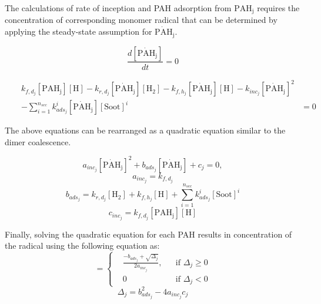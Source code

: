 The calculations of rate of inception and PAH adsorption from $\mathrm{PAH_j}$ requires the concentration of corresponding monomer radical that can be determined by applying the steady-state assumption for $\mathrm{\dot{PAH}_j}$.

\begin{equation*}
	\frac{d[\mathrm{\dot{PAH}_j}]}{dt} = 0
\end{equation*}

\begin{equation*}
	\begin{aligned}
		&&k_{f,d_j}[\mathrm{PAH_j}][\mathrm{H}]
		-k_{r,d_j}[\mathrm{\dot{PAH}_j}][\mathrm{H_2}]
		-k_{f,h_j}[\mathrm{\dot{PAH}_j}][\mathrm{H}]
		-k_{inc_j}[\mathrm{\dot{PAH}_j}]^2 &\\
		&&-\sum_{i=1}^{n_{sec}}k^i_{ads_j}[\mathrm{\dot{PAH}_j}][\mathrm{Soot}]^i
		&= 0
	\end{aligned}
\end{equation*}

The above equations can be rearranged as a quadratic equation similar to the dimer coalescence.

\begin{equation}
	a_{inc_j}[\mathrm{\dot{PAH}_j}]^2+
	b_{ads_j}[\mathrm{\dot{PAH}_j}] + c_j = 0,
\end{equation}
\begin{equation}
	a_{inc_j}=k_{f,d_j}
\end{equation}
\begin{equation}
	b_{ads_j}=k_{r,d_j}[\mathrm{H_2}]+k_{f,h_j}[\mathrm{H}]+\sum_{i=1}^{n_{sec}}k^i_{ads_j}[\mathrm{Soot}]^i
\end{equation}
\begin{equation}
	c_{inc_j}=k_{f,d_j}[\mathrm{PAH_j}][\mathrm{H}]
\end{equation}

Finally, solving the quadratic equation for each PAH results in concentration of the radical using the following equation as:
\begin{equation}
	[\mathrm{\mathrm{\dot{PAH}}_j}]=
	\left\{
	\begin{aligned}
		&\frac{-b_{ads_j}+\sqrt{\Delta_j}}{2a_{inc_j}},
		&&
		\text{if } \Delta_j \ge 0
		\\
		& 0 
		&&
		\text{if } \Delta_j < 0
	\end{aligned}
	\right.
	\label{eqn:rad_ebri}
\end{equation}
\begin{equation}
	\Delta_j = b_{ads_j}^2-4a_{inc_j}c_{j}
	\label{eqn:delta_ebri}
\end{equation}

